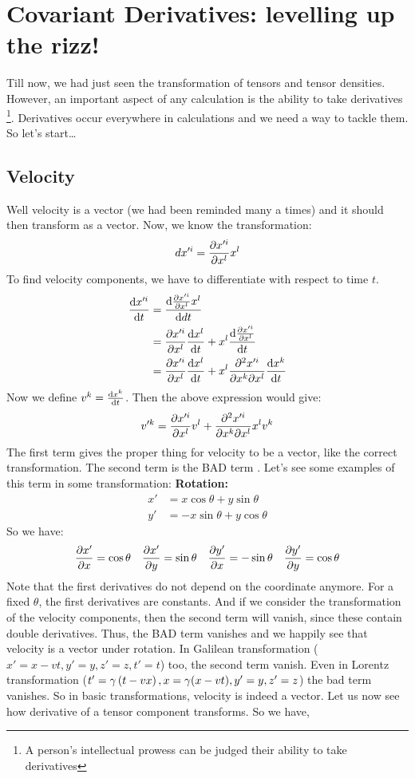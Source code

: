 \section{Covariant Derivatives: levelling up the rizz!}
Till now, we had just seen the transformation of tensors and tensor densities. However, an important aspect of any calculation is the ability to take derivatives \footnote{A person's intellectual prowess can be judged their ability to take derivatives }. Derivatives occur everywhere in calculations and we need a way to tackle them. So let's start\dots

\subsection{Velocity}
Well velocity is a vector (we had been reminded many a times) and it should then transform as a vector. Now, 
we know the transformation:
$$dx'^i = \pdv{x'^i}{x^l}x^l$$
To find velocity components, we have to differentiate with respect to time $t$. 
\begin{align*}
    \dv{x'^i}{t} &= \dv{\pdv{x'^i}{x^l}x^l}{dt}\\
    &=\pdv{x'^i}{x^l}\dv{x^l}{t} + x^l \dv{\pdv{x'^i}{x^l}}{t}\\
    &=\pdv{x'^i}{x^l}\dv{x^l}{t} + x^l \pdv{x'^i}{x^k}{x^l}\dv{x^k}{t}
\end{align*}
Now we define $v^k = \dv{x^k}{t}$. Then the above expression would give:
\begin{align*}
    v'^k = \pdv{x'^i}{x^l}v^l +  \pdv{x'^i}{x^k}{x^l}x^l v^k
\end{align*}
The first term gives the proper thing for velocity to be a vector, like the correct transformation. The second term is the BAD term . Let's see some examples of this term in some transformation:
\textbf{Rotation:}\\
\begin{align*}
    x' &= x\cos\theta+y\sin\theta\\
    y'&=-x\sin\theta + y\cos\theta
\end{align*}
So we have: 
\begin{align*}
    \pdv{x'}{x} = \cos\theta \quad  \pdv{x'}{y} = \sin\theta \quad  \pdv{y'}{x} = -\sin\theta \quad
    \pdv{y'}{y} = \cos\theta
\end{align*}
Note that the first derivatives do not depend on the coordinate anymore. For a fixed $\theta$, the first derivatives are constants. 
And if we consider the transformation of the velocity components, then the second term will vanish, since these contain double derivatives. Thus, the BAD term vanishes and we happily see that velocity is a vector under rotation. In Galilean transformation ($x'=x-vt, y'=y, z'=z, t'=t$) too, the second term vanish. Even in Lorentz transformation ($t' = \gamma \left( t-vx \right), x=\gamma(x-vt), y'=y, z'=z$) the bad term vanishes. So in basic transformations, velocity is indeed a vector. Let us now see how derivative of a tensor component transforms. So we have,
